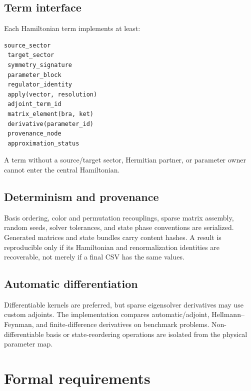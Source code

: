 \documentclass[11pt]{article}
\begin{document}
\subsection{Term interface}

Each Hamiltonian term implements at least:
\begin{verbatim}
source_sector
 target_sector
 symmetry_signature
 parameter_block
 regulator_identity
 apply(vector, resolution)
 adjoint_term_id
 matrix_element(bra, ket)
 derivative(parameter_id)
 provenance_node
 approximation_status
\end{verbatim}
A term without a source/target sector, Hermitian partner, or parameter owner
cannot enter the central Hamiltonian.

\subsection{Determinism and provenance}

Basis ordering, color and permutation recouplings, sparse matrix assembly,
random seeds, solver tolerances, and state phase conventions are serialized.
Generated matrices and state bundles carry content hashes.  A result is
reproducible only if its Hamiltonian and renormalization identities are
recoverable, not merely if a final CSV has the same values.

\subsection{Automatic differentiation}

Differentiable kernels are preferred, but sparse eigensolver derivatives may
use custom adjoints.  The implementation compares automatic/adjoint,
Hellmann--Feynman, and finite-difference derivatives on benchmark problems.
Non-differentiable basis or state-reordering operations are isolated from the
physical parameter map.

\section{Formal requirements}
\label{sec:requirements}
\end{document}
